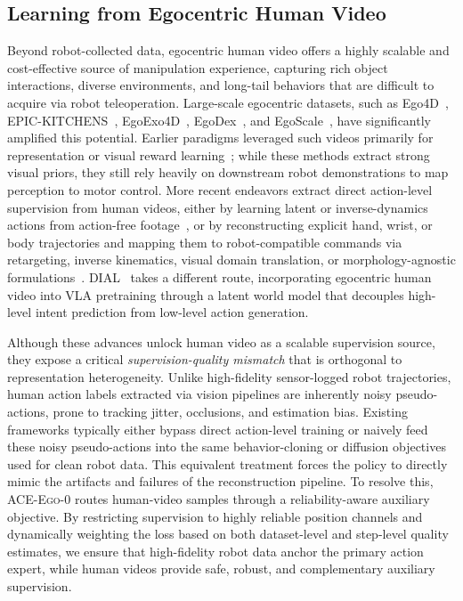 \documentclass{article}
\newcommand{\OURS}{\textsc{ACE-Ego-0}\xspace}
\newcommand{\Ours}{\OURS}
\begin{document}
\subsection{Learning from Egocentric Human Video}
Beyond robot-collected data, egocentric human video offers a highly scalable and cost-effective source of manipulation experience, capturing rich object interactions, diverse environments, and long-tail behaviors that are difficult to acquire via robot teleoperation. Large-scale egocentric datasets, such as Ego4D~\cite{grauman2022ego4d}, EPIC-KITCHENS~\cite{damen2022epickitchens}, EgoExo4D~\cite{grauman2024egoexo4d}, EgoDex~\cite{hoque2025egodex}, and EgoScale~\cite{zheng2026egoscale}, have significantly amplified this potential. 
Earlier paradigms leveraged such videos primarily for representation or visual reward learning~\cite{nair2022r3m,ma2022vip,ma2023liv,xiao2022mvp,majumdar2023vc1,karamcheti2023voltron,lin2022egovlp,zhao2023lavila}; while these methods extract strong visual priors, they still rely heavily on downstream robot demonstrations to map perception to motor control. 
More recent endeavors extract direct action-level supervision from human videos, either by learning latent or inverse-dynamics actions from action-free footage~\cite{ye2025lapa}, or by reconstructing explicit hand, wrist, or body trajectories and mapping them to robot-compatible commands via retargeting, inverse kinematics, visual domain translation, or morphology-agnostic formulations~\cite{fu2024humanplus,li2024okami,kareer2024egomimic,lepert2025phantom,yang2025egovla,zhu2025emma,li2025h2r,liu2025egozero,bharadhwaj2025zeromimic}.
DIAL~\cite{chen2026dial} takes a different route, incorporating egocentric human video into VLA pretraining through a latent world model that decouples high-level intent prediction from low-level action generation.


Although these advances unlock human video as a scalable supervision source, they expose a critical \emph{supervision-quality mismatch} that is orthogonal to representation heterogeneity. Unlike high-fidelity sensor-logged robot trajectories, human action labels extracted via vision pipelines are inherently noisy pseudo-actions, prone to tracking jitter, occlusions, and estimation bias. 
Existing frameworks typically either bypass direct action-level training or naively feed these noisy pseudo-actions into the same behavior-cloning or diffusion objectives used for clean robot data. This equivalent treatment forces the policy to directly mimic the artifacts and failures of the reconstruction pipeline. 
To resolve this, \Ours routes human-video samples through a reliability-aware auxiliary objective. By restricting supervision to highly reliable position channels and dynamically weighting the loss based on both dataset-level and step-level quality estimates, we ensure that high-fidelity robot data anchor the primary action expert, while human videos provide safe, robust, and complementary auxiliary supervision.
\end{document}
